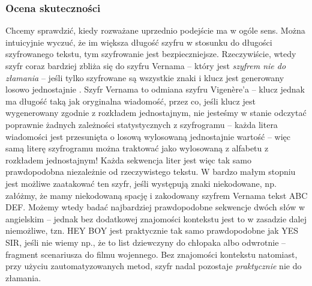 \documentclass[a4paper]{article}
\theoremstyle{defn}
\theoremstyle{theorem}
\theoremstyle{lemma}
\theoremstyle{cor}
\theoremstyle{fact}
\begin{document}
\subsubsection{Ocena skuteczności}
Chcemy sprawdzić, kiedy rozważane uprzednio podejście ma w ogóle sens. Można intuicyjnie wyczuć, że im większa długość szyfru w stosunku do długości szyfrowanego tekstu, tym szyfrowanie jest bezpieczniejsze. Rzeczywiście, wtedy szyfr coraz bardziej zbliża się do szyfru Vernama – który jest \textit{szyfrem nie do złamania} – jeśli tylko szyfrowane są wszystkie znaki i klucz jest generowany losowo jednostajnie \cite{shannon}. Szyfr Vernama to odmiana szyfru Vigenère'a – klucz jednak ma długość taką jak oryginalna wiadomość, przez co, jeśli klucz jest wygenerowany zgodnie z rozkładem jednostajnym, nie jesteśmy w stanie odczytać poprawnie żadnych zależności statystycznych z szyfrogramu – każda litera wiadomości jest przesunięta o losową wylosowaną jednostajnie wartość – więc samą literę szyfrogramu można traktować jako wylosowaną z alfabetu z rozkładem jednostajnym! Każda sekwencja liter jest więc tak samo prawdopodobna niezależnie od rzeczywistego tekstu. W bardzo małym stopniu jest możliwe zaatakować ten szyfr, jeśli występują znaki niekodowane, np. załóżmy, że mamy niekodowaną spację i zakodowany szyfrem Vernama tekst ABC DEF. Możemy wtedy badać najbardziej prawdopodobne sekwencje dwóch słów w angielskim – jednak bez dodatkowej znajomości kontekstu jest to w zasadzie dalej niemożliwe, tzn. HEY BOY jest praktycznie tak samo prawdopodobne jak YES SIR, jeśli nie wiemy np., że to list dziewczyny do chłopaka albo odwrotnie – fragment scenariusza do filmu wojennego. Bez znajomości kontekstu natomiast, przy użyciu zautomatyzowanych metod, szyfr nadal pozostaje \textit{praktycznie} nie do złamania.\\
\end{document}
